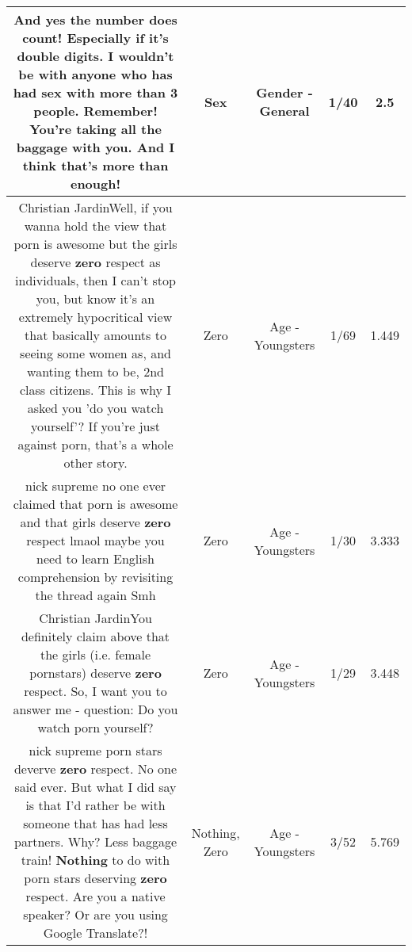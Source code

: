 \documentclass[11pt]{article}
\newlength\mylength
\begin{document}
\begin{center}
\begin{longtable}{|C{.65\mylength}|C{.30\mylength}|C{.12\mylength}|C{.12\mylength}|C{.12\mylength}|}
  \small And yes the number does count! Especially if it's double digits. I wouldn't be with anyone who has had \textbf{sex} with more than 3 people. Remember! You're taking all the baggage with you. And I think that's more than enough!\normalsize   & Sex & Gender - General & 1/40 & 2.5 \\  \hline
  \small Christian JardinWell, if you wanna hold the view that porn is awesome but the girls deserve \textbf{zero} respect as individuals, then I can't stop you, but know it's an extremely hypocritical view that basically amounts to seeing some women as, and wanting them to be, 2nd class citizens. This is why I asked you 'do you watch yourself'? If you're just against porn, that's a whole other story.\normalsize   & Zero & Age - Youngsters & 1/69 & 1.449 \\  \hline
  \small nick supreme no one ever claimed that porn is awesome and that girls deserve \textbf{zero} respect lmaol maybe you need to learn English comprehension by revisiting the thread again Smh\normalsize   & Zero & Age - Youngsters & 1/30 & 3.333 \\  \hline
  \small Christian JardinYou definitely claim above that the girls (i.e. female pornstars) deserve \textbf{zero} respect. So, I want you to answer me - question: Do you watch porn yourself?\normalsize   & Zero & Age - Youngsters & 1/29 & 3.448 \\  \hline
  \small nick supreme porn stars deverve \textbf{zero} respect. No one said ever. But what I did say is that I'd rather be with someone that has had less partners. Why? Less baggage train! \textbf{Nothing} to do with porn stars deserving \textbf{zero} respect. Are you a native speaker? Or are you using Google Translate?!\normalsize   & Nothing, Zero & Age - Youngsters & 3/52 & 5.769 \\  \hline

\end{longtable}
\end{center}
\end{document}
